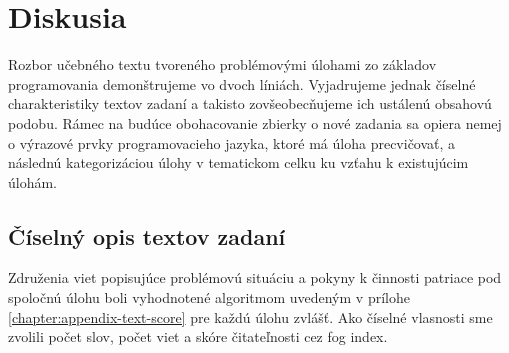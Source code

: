 \section{Diskusia}
Rozbor učebného textu tvoreného problémovými úlohami zo základov programovania demonštrujeme vo dvoch líniách. Vyjadrujeme jednak číselné charakteristiky textov zadaní a takisto zovšeobecňujeme ich ustálenú obsahovú podobu. Rámec na budúce obohacovanie zbierky o nové zadania sa opiera nemej o výrazové prvky programovacieho jazyka, ktoré má úloha precvičovať, a následnú kategorizáciou úlohy v tematickom celku ku vzťahu k existujúcim úlohám.

\subsection{Číselný opis textov zadaní}
Združenia viet popisujúce problémovú situáciu a pokyny k činnosti patriace pod spoločnú úlohu boli vyhodnotené algoritmom uvedeným v prílohe \ref{chapter:appendix-text-score} pre každú úlohu zvlášť. Ako číselné vlasnosti sme zvolili počet slov, počet viet a skóre čitateľnosti cez fog index.

